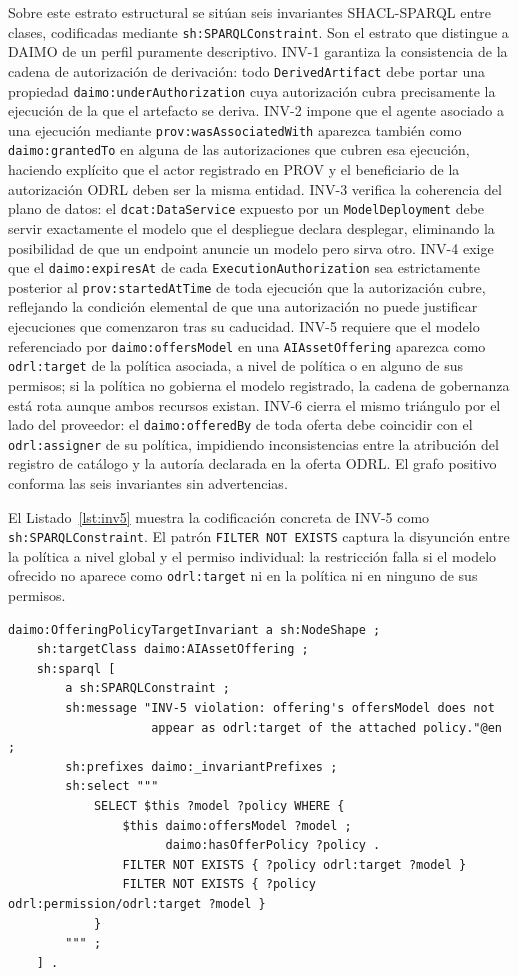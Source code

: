 \documentclass[11pt,a4paper]{article}
\newcommand{\code}[1]{\texttt{#1}}
\begin{document}
Sobre este estrato estructural se sitúan seis invariantes SHACL-SPARQL entre clases, codificadas mediante \code{sh:SPARQLConstraint}. Son el estrato que distingue a DAIMO de un perfil puramente descriptivo. INV-1 garantiza la consistencia de la cadena de autorización de derivación: todo \code{DerivedArtifact} debe portar una propiedad \code{daimo:underAuthorization} cuya autorización cubra precisamente la ejecución de la que el artefacto se deriva. INV-2 impone que el agente asociado a una ejecución mediante \code{prov:wasAssociatedWith} aparezca también como \code{daimo:grantedTo} en alguna de las autorizaciones que cubren esa ejecución, haciendo explícito que el actor registrado en PROV y el beneficiario de la autorización ODRL deben ser la misma entidad. INV-3 verifica la coherencia del plano de datos: el \code{dcat:DataService} expuesto por un \code{ModelDeployment} debe servir exactamente el modelo que el despliegue declara desplegar, eliminando la posibilidad de que un endpoint anuncie un modelo pero sirva otro. INV-4 exige que el \code{daimo:expiresAt} de cada \code{ExecutionAuthorization} sea estrictamente posterior al \code{prov:startedAtTime} de toda ejecución que la autorización cubre, reflejando la condición elemental de que una autorización no puede justificar ejecuciones que comenzaron tras su caducidad. INV-5 requiere que el modelo referenciado por \code{daimo:offersModel} en una \code{AIAssetOffering} aparezca como \code{odrl:target} de la política asociada, a nivel de política o en alguno de sus permisos; si la política no gobierna el modelo registrado, la cadena de gobernanza está rota aunque ambos recursos existan. INV-6 cierra el mismo triángulo por el lado del proveedor: el \code{daimo:offeredBy} de toda oferta debe coincidir con el \code{odrl:assigner} de su política, impidiendo inconsistencias entre la atribución del registro de catálogo y la autoría declarada en la oferta ODRL. El grafo positivo conforma las seis invariantes sin advertencias.

El Listado~\ref{lst:inv5} muestra la codificación concreta de INV-5 como \code{sh:SPARQLConstraint}. El patrón \code{FILTER NOT EXISTS} captura la disyunción entre la política a nivel global y el permiso individual: la restricción falla si el modelo ofrecido no aparece como \code{odrl:target} ni en la política ni en ninguno de sus permisos.

\begin{lstlisting}[label=lst:inv5,caption={Invariante INV-5 como \code{sh:SPARQLConstraint}.}]
daimo:OfferingPolicyTargetInvariant a sh:NodeShape ;
    sh:targetClass daimo:AIAssetOffering ;
    sh:sparql [
        a sh:SPARQLConstraint ;
        sh:message "INV-5 violation: offering's offersModel does not
                    appear as odrl:target of the attached policy."@en ;
        sh:prefixes daimo:_invariantPrefixes ;
        sh:select """
            SELECT $this ?model ?policy WHERE {
                $this daimo:offersModel ?model ;
                      daimo:hasOfferPolicy ?policy .
                FILTER NOT EXISTS { ?policy odrl:target ?model }
                FILTER NOT EXISTS { ?policy odrl:permission/odrl:target ?model }
            }
        """ ;
    ] .
\end{lstlisting}
\end{document}
